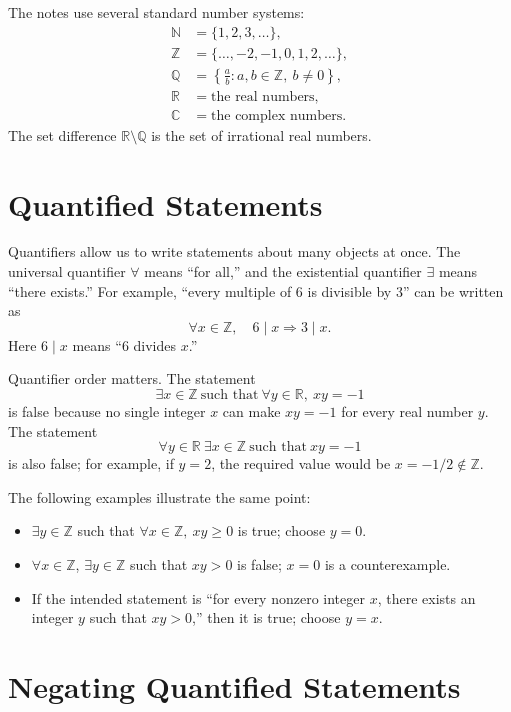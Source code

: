 The notes use several standard number systems:
\[
\begin{aligned}
    \mathbb{N} &= \{1,2,3,\ldots\},\\
    \mathbb{Z} &= \{\ldots,-2,-1,0,1,2,\ldots\},\\
    \mathbb{Q} &= \left\{\frac{a}{b}:a,b\in\mathbb{Z},\ b\neq 0\right\},\\
    \mathbb{R} &= \text{the real numbers},\\
    \mathbb{C} &= \text{the complex numbers}.
\end{aligned}
\]
The set difference \(\mathbb{R}\setminus\mathbb{Q}\) is the set of irrational real numbers.

\section{Quantified Statements}
\label{mf:quantifiers}

Quantifiers allow us to write statements about many objects at once. The universal quantifier \(\forall\) means ``for all,'' and the existential quantifier \(\exists\) means ``there exists.'' For example, ``every multiple of 6 is divisible by 3'' can be written as
\[
    \forall x\in\mathbb{Z},\quad 6\mid x\Rightarrow 3\mid x.
\]
Here \(6\mid x\) means ``6 divides \(x\).''

\label{mf:quantifier-order}
Quantifier order matters. The statement
\[
    \exists x\in\mathbb{Z}\ \text{such that}\ \forall y\in\mathbb{R},\ xy=-1
\]
is false because no single integer \(x\) can make \(xy=-1\) for every real number \(y\). The statement
\[
    \forall y\in\mathbb{R}\ \exists x\in\mathbb{Z}\ \text{such that}\ xy=-1
\]
is also false; for example, if \(y=2\), the required value would be \(x=-1/2\notin\mathbb{Z}\).

The following examples illustrate the same point:
\begin{itemize}
    \item \(\exists y\in\mathbb{Z}\) such that \(\forall x\in\mathbb{Z},\ xy\geq 0\) is true; choose \(y=0\).
    \item \(\forall x\in\mathbb{Z}\), \(\exists y\in\mathbb{Z}\) such that \(xy>0\) is false; \(x=0\) is a counterexample.
    \item If the intended statement is ``for every nonzero integer \(x\), there exists an integer \(y\) such that \(xy>0\),'' then it is true; choose \(y=x\).
\end{itemize}

\section{Negating Quantified Statements}
\label{mf:quantifier-negation}

